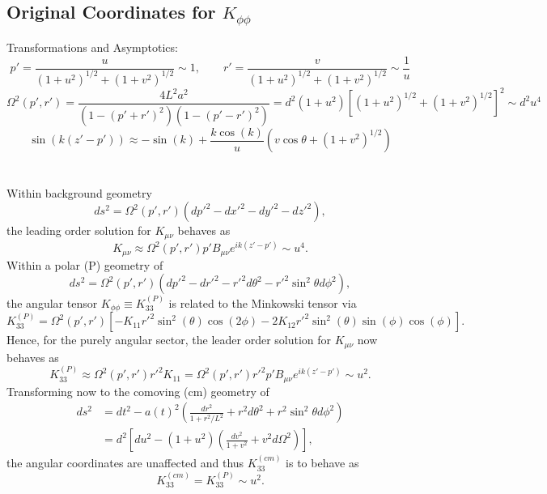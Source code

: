 \documentclass[10pt,letterpaper]{article}
\begin{document}
\subsection*{Original Coordinates for $K_{\phi\phi}$}
Transformations and Asymptotics:
\begin{equation}
p' = \frac{u}{(1+u^2)^{1/2}+(1+v^2)^{1/2}}\sim 1,\qquad r' = \frac{v}{(1+u^2)^{1/2}+(1+v^2)^{1/2}}\sim \frac1u
\end{equation}
\begin{equation}
\Omega^2(p',r') = \frac{4 L^2 a^2}{(1-(p'+r')^2)(1-(p'-r')^2)} = d^2(1+u^2)\left[ (1+u^2)^{1/2}+(1+v^2)^{1/2}\right]^2\sim d^2 u^4
\end{equation}
\begin{equation}
\sin(k(z'-p')) \approx -\sin(k) + \frac{k\cos(k)}{u}(v\cos\theta+(1+v^2)^{1/2})
\end{equation}
\\ \\
Within background geometry
\begin{equation}
ds^2 = \Omega^2(p',r')(dp'^2 - dx'^2-dy'^2 -dz'^2),
\end{equation}
the leading order solution for $K_{\mu\nu}$ behaves as
\begin{equation} 
K_{\mu\nu} \approx \Omega^2(p',r') p' B_{\mu\nu} e^{ik(z'-p')} \sim u^4.
\end{equation}
Within a polar (P) geometry of 
\begin{equation}
ds^2 = \Omega^2(p',r')(dp'^2 - dr'^2 - r'^2 d\theta^2-r'^2\sin^2\theta d\phi^2),
\end{equation}
the angular tensor $K_{\phi\phi} \equiv K^{(P)}_{33}$ is related to the Minkowski tensor via
\begin{equation}
K^{(P)}_{33} = \Omega^2(p',r')\left[-K_{11} r'^2 \sin ^2(\theta ) \cos (2 \phi )-2 K_{12} r'^2 \sin ^2(\theta ) \sin (\phi ) \cos (\phi )\right].
\end{equation}
Hence, for the purely angular sector, the leader order solution for $K_{\mu\nu}$ now behaves as
\begin{equation} 
K^{(P)}_{33} \approx \Omega^2(p',r') r'^2 K_{11} = \Omega^2(p',r') r'^2 p' B_{\mu\nu} e^{ik(z'-p')} \sim u^2.
\end{equation}
Transforming now to the comoving (cm) geometry of 
\begin{align}
ds^2 &=  dt^2 - a(t)^2 \left(  \frac{dr^2}{1+r^2/L^2} + r^2 d\theta^2 + r^2\sin^2\theta d\phi^2 \right)\nonumber\\
&= d^2 \left[ du^2 - (1+u^2)\left( \frac{dv^2}{1+v^2} + v^2 d\Omega^2\right)\right] ,
\end{align}
the angular coordinates are unaffected and thus $K_{33}^{(cm)}$ is to behave as
\begin{equation} 
\boxed{
K^{(cm)}_{33} = K^{(P)}_{33} \sim u^2}.
\end{equation}
\end{document}
